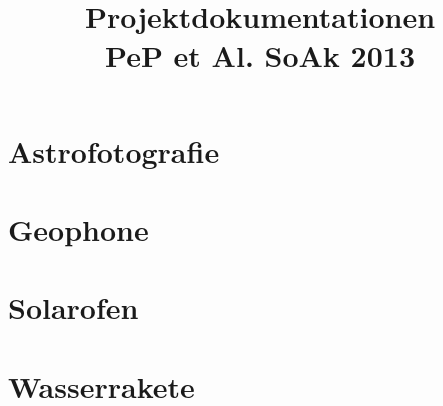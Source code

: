 \documentclass[pdftex, twoside, BCOR12mm, parskip=half]{scrartcl}
\begin{document}
\title{Projektdokumentationen \\
		\large{PeP et Al. SoAk 2013}}


\maketitle
\thispagestyle{empty}
\setcounter{page}{0}
\newpage
\newpage
\tableofcontents
\newpage

\section{Astrofotografie}

\section{Geophone}

\section{Solarofen}

\section{Wasserrakete}

\end{document}
